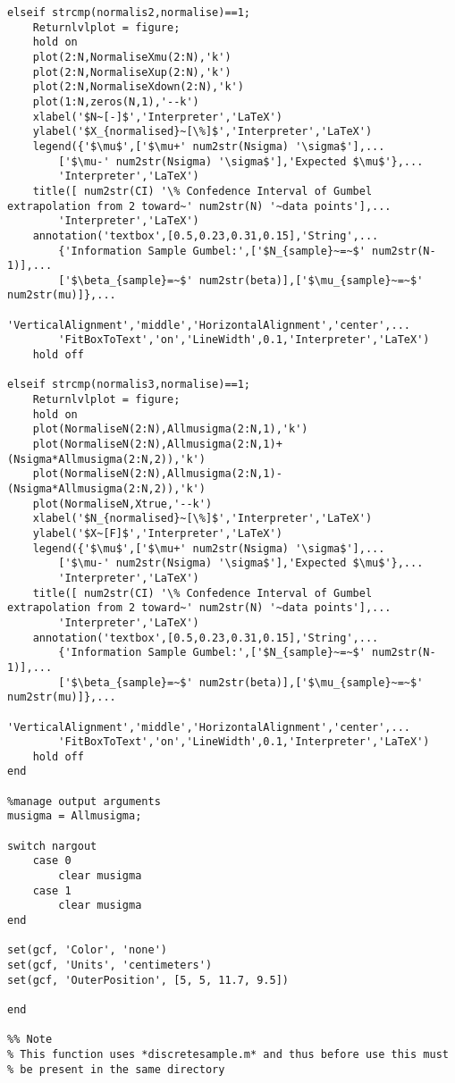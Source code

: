 \begin{lstlisting}
elseif strcmp(normalis2,normalise)==1;
    Returnlvlplot = figure;
    hold on
    plot(2:N,NormaliseXmu(2:N),'k')
    plot(2:N,NormaliseXup(2:N),'k')
    plot(2:N,NormaliseXdown(2:N),'k')
    plot(1:N,zeros(N,1),'--k')
    xlabel('$N~[-]$','Interpreter','LaTeX')
    ylabel('$X_{normalised}~[\%]$','Interpreter','LaTeX')
    legend({'$\mu$',['$\mu+' num2str(Nsigma) '\sigma$'],...
        ['$\mu-' num2str(Nsigma) '\sigma$'],'Expected $\mu$'},...
        'Interpreter','LaTeX')
    title([ num2str(CI) '\% Confedence Interval of Gumbel extrapolation from 2 toward~' num2str(N) '~data points'],...
        'Interpreter','LaTeX')
    annotation('textbox',[0.5,0.23,0.31,0.15],'String',...
        {'Information Sample Gumbel:',['$N_{sample}~=~$' num2str(N-1)],...
        ['$\beta_{sample}=~$' num2str(beta)],['$\mu_{sample}~=~$' num2str(mu)]},...
        'VerticalAlignment','middle','HorizontalAlignment','center',...
        'FitBoxToText','on','LineWidth',0.1,'Interpreter','LaTeX')
    hold off
    
elseif strcmp(normalis3,normalise)==1;
    Returnlvlplot = figure;
    hold on
    plot(NormaliseN(2:N),Allmusigma(2:N,1),'k')
    plot(NormaliseN(2:N),Allmusigma(2:N,1)+(Nsigma*Allmusigma(2:N,2)),'k')
    plot(NormaliseN(2:N),Allmusigma(2:N,1)-(Nsigma*Allmusigma(2:N,2)),'k')
    plot(NormaliseN,Xtrue,'--k')
    xlabel('$N_{normalised}~[\%]$','Interpreter','LaTeX')
    ylabel('$X~[F]$','Interpreter','LaTeX')
    legend({'$\mu$',['$\mu+' num2str(Nsigma) '\sigma$'],...
        ['$\mu-' num2str(Nsigma) '\sigma$'],'Expected $\mu$'},...
        'Interpreter','LaTeX')
    title([ num2str(CI) '\% Confedence Interval of Gumbel extrapolation from 2 toward~' num2str(N) '~data points'],...
        'Interpreter','LaTeX')
    annotation('textbox',[0.5,0.23,0.31,0.15],'String',...
        {'Information Sample Gumbel:',['$N_{sample}~=~$' num2str(N-1)],...
        ['$\beta_{sample}=~$' num2str(beta)],['$\mu_{sample}~=~$' num2str(mu)]},...
        'VerticalAlignment','middle','HorizontalAlignment','center',...
        'FitBoxToText','on','LineWidth',0.1,'Interpreter','LaTeX')
    hold off
end

%manage output arguments
musigma = Allmusigma;

switch nargout
    case 0
        clear musigma
    case 1
        clear musigma
end

set(gcf, 'Color', 'none')
set(gcf, 'Units', 'centimeters')
set(gcf, 'OuterPosition', [5, 5, 11.7, 9.5])

end

%% Note
% This function uses *discretesample.m* and thus before use this must
% be present in the same directory


\end{lstlisting}
